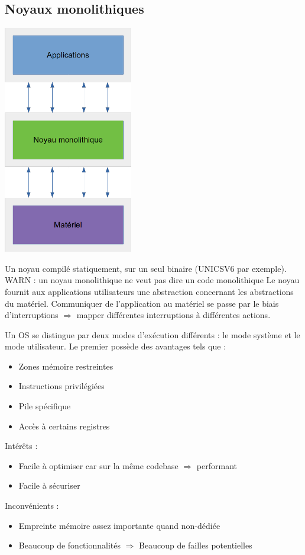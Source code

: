 \subsection{Noyaux monolithiques}
\begin{center}
  \includegraphics[height=10cm]{cours1/pics/cours1_monolith.png}
\end{center}
Un noyau compilé statiquement, sur un seul binaire (UNICSV6 par exemple).
\\
WARN : un noyau monolithique ne veut pas dire un code monolithique
Le noyau fournit aux applications utilisateurs une abstraction concernant les
abstractions du matériel. Communiquer de l'application au matériel se passe par
le biais d'interruptions $\Rightarrow$ mapper différentes interruptions à différentes
actions.

Un OS se distingue par deux modes d'exécution différents : le mode système et le
mode utilisateur. Le premier possède des avantages tels que :
\begin{itemize}
  \item Zones mémoire restreintes
  \item Instructions privilégiées
  \item Pile spécifique
  \item Accès à certains registres
\end{itemize}

Intérêts :
\begin{itemize}
  \item Facile à optimiser car sur la même codebase $\Rightarrow$ performant
  \item Facile à sécuriser
\end{itemize}
Inconvénients :
\begin{itemize}
  \item Empreinte mémoire assez importante quand non-dédiée
  \item Beaucoup de fonctionnalités $\Rightarrow$ Beaucoup de failles potentielles
\end{itemize}


